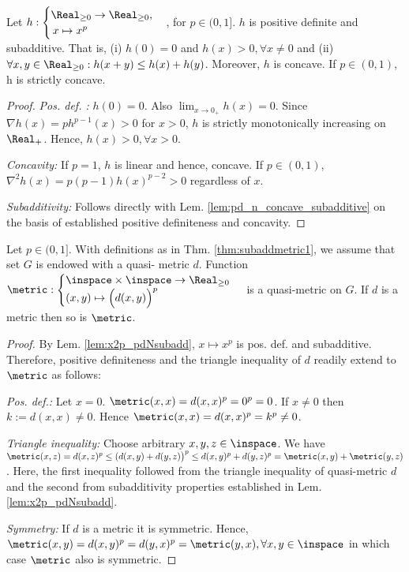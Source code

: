 \begin{lem} \label{lem:x2p_pdNsubadd}
 Let $h: \begin{cases} \Real_{\geq 0} \to \Real_{\geq 0},\\ \, x \mapsto x^p\end{cases}$, for $p \in (0,1] $. $h$ is positive definite and subadditive. 
 That is, (i) $h(0) = 0 $ and  $h(x) > 0, \forall x \neq 0$ and (ii) $\forall x,y \in \Real_{\geq 0}: h(x+y) \leq h(x) + h(y)  $.
 Moreover, $h$ is concave. If $p \in (0,1)$, h is strictly concave. 
 
\begin{proof}
\textit{Pos. def. :} $h(0) = 0$.  Also $\lim_{x \to 0_+} h(x) =0$. Since $\nabla h (x) = p h^{p-1}(x) >0 $ for $x >0$, $h$ is strictly monotonically increasing on $\Real_+$. Hence, $h(x) > 0, \forall x >0$. 

\textit{Concavity:} If $p =1$, $h$ is linear and hence, concave. If $p \in (0,1)$, $\nabla^2 h(x) = p (p-1) h(x)^{p-2} > 0$ regardless of $x$.

\textit{Subadditivity:} Follows directly with Lem. \ref{lem:pd_n_concave_subadditive} on the basis of established positive definiteness and concavity.
  
\end{proof}
\end{lem}



\begin{lem}\label{lem:hoeldererror_metric}
Let $p \in (0,1]$.
With definitions as in Thm. \ref{thm:subaddmetric1}, we assume that set $G$ is endowed with a quasi- metric $d$. Function
$\metric: \begin{cases} \inspace \times \inspace \to \Real_{\geq 0} \\ (x,y) \mapsto \Bigl(d(x,y)\Bigr)^p \end{cases}$ is a quasi-metric on $G$.
If $d$ is a metric then so is $\metric$.
\begin{proof}
 By Lem. \ref{lem:x2p_pdNsubadd}, $x\mapsto x^p$ is pos. def. and subadditive. Therefore, positive definiteness and the triangle inequality of $d$ readily extend to $\metric$ as follows: 

\textit{Pos. def.:}
Let $x=0$. $\metric(x,x) = d(x,x)^p = 0^p = 0$. If $x \neq 0$ then $k :=d(x,x) \neq 0$. Hence   $\metric(x,x) = d(x,x)^p = k^p \neq 0$.

\textit{Triangle inequality:}
Choose arbitrary $x,y,z \in \inspace $. We have $\metric(x,z) = d(x,z)^p \leq (d(x,y) + d(y,z) \bigr)^p \leq d(x,y)^p + d(y,z)^p = \metric(x,y) + \metric(y,z)$. Here, the first inequality followed from the triangle inequality of quasi-metric $d$ and the second from subadditivity properties established in Lem. \ref{lem:x2p_pdNsubadd}.

\textit{Symmetry:} If $d$ is a metric it is symmetric. Hence, $\metric(x,y) = d(x,y)^p = d(y,x)^p = \metric(y,x), \forall x,y \in \inspace $ in which case $\metric$ also is symmetric.
\end{proof}
\end{lem}

